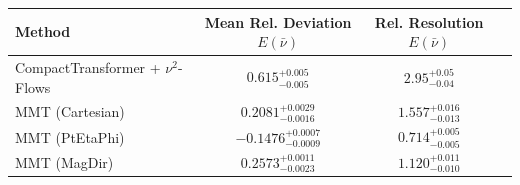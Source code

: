     \begin{tabular}{lccc}
        \toprule
        Method & Mean Rel. Deviation $E(\bar{\nu})$ & Rel. Resolution $E(\bar{\nu})$ \\
        \midrule
        CompactTransformer + $\nu^2$-Flows & $0.615^{+0.005}_{-0.005}$ & $2.95^{+0.05}_{-0.04}$ \\
        MMT (Cartesian) & $0.2081^{+0.0029}_{-0.0016}$ & $1.557^{+0.016}_{-0.013}$ \\
        MMT (PtEtaPhi) & $-0.1476^{+0.0007}_{-0.0009}$ & $0.714^{+0.005}_{-0.005}$ \\
        MMT (MagDir) & $0.2573^{+0.0011}_{-0.0023}$ & $1.120^{+0.011}_{-0.010}$ \\
        \bottomrule
    \end{tabular}